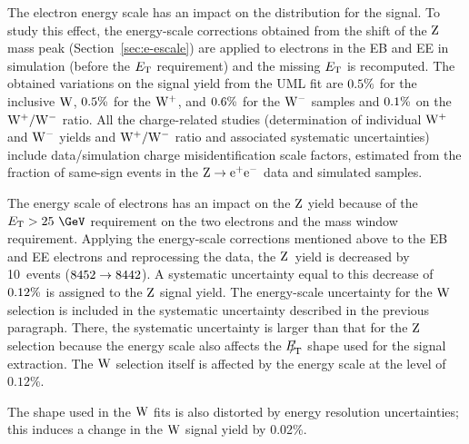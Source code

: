 \par
The electron energy scale has an impact on the \ET distribution
for the signal. To study this effect, the
energy-scale corrections obtained
from the shift of the $\mathrm{Z}$ mass peak
(Section~\ref{sec:e-escale}) are applied to electrons in the EB and EE
in simulation (before the $E\,\,_{\!\!\!\mathrm{T}}$ requirement)
and  the missing $E\,\,_{\!\!\!\mathrm{T}}$ is recomputed.
The obtained variations on the signal yield from the UML fit
are $ 0.5  \%$ for the inclusive $\mathrm{W}$, $ 0.5  \%$ for the $\mathrm{W^+}$, and
$ 0.6  \%$ for the $\mathrm{W^-}$ samples and $ 0.1  \%$ on the
$\mathrm{W^+}/\mathrm{W^-}$ ratio.  All the charge-related studies (determination of individual $\mathrm{W^+}$ and $\mathrm{W^-}$
yields and $\mathrm{W^+}/\mathrm{W^-}$ ratio and associated systematic uncertainties)
include data/simulation
charge misidentification scale factors, estimated from
the fraction of same-sign events in the $\mathrm{Z} \rightarrow \mathrm{e}^+\mathrm{e}^-$ data and simulated samples.
\par
The energy scale of electrons has an impact on the $\mathrm{Z}$ yield because of 
the $\Et>25~\GeV$ requirement on the two electrons and the mass window requirement.
Applying the energy-scale corrections
mentioned above to the EB and EE electrons and reprocessing the data, 
the $\mathrm{Z}$~yield is decreased by 10~events ($8452  \to 8442 $).
A systematic uncertainty equal to this decrease of $ 0.12  \%$
is assigned to the $\mathrm{Z}$ signal yield.
The energy-scale uncertainty for the $\mathrm{W}$ selection is included in the systematic uncertainty 
described in the previous paragraph. There, the systematic uncertainty 
is larger than that for the $\mathrm{Z}$ selection because the energy scale also affects the 
${E\!\!\!/}_{\!\mathrm{T}}$ shape used for the signal extraction.
The $\mathrm{W}$ selection itself is affected by the energy scale at the level of $0.12\%$.
\par
The \MET shape used in the $\mathrm{W}$ fits is also distorted
by energy resolution uncertainties; this induces a change in the $\mathrm{W}$ signal yield
by 0.02\%.

\par



